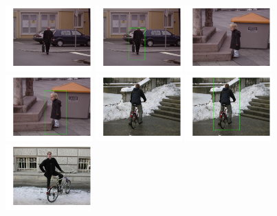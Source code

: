 \includegraphics[width=0.25\textwidth]{facedetection_files/facedetection_62_0.png}
\includegraphics[width=0.25\textwidth]{facedetection_files/facedetection_62_1.png}
\includegraphics[width=0.25\textwidth]{facedetection_files/facedetection_62_2.png}
\includegraphics[width=0.25\textwidth]{facedetection_files/facedetection_62_3.png}
\includegraphics[width=0.25\textwidth]{facedetection_files/facedetection_62_4.png}
\includegraphics[width=0.25\textwidth]{facedetection_files/facedetection_62_5.png}
\includegraphics[width=0.25\textwidth]{facedetection_files/facedetection_62_6.png}
